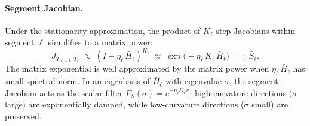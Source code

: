 \documentclass[11pt]{article}
\begin{document}
\paragraph{Segment Jacobian.} Under the stationarity approximation, the product of $K_\ell$ step Jacobians within segment $\ell$ simplifies to a matrix power:
\begin{equation}\label{eq:segment-jacobian}
  J_{T_{\ell-1}:T_\ell} \;\approx\; (I - \bar\eta_\ell\,\bar{H}_\ell)^{K_\ell} \;\approx\; \exp\bigl(-\bar\eta_\ell\,K_\ell\,\bar{H}_\ell\bigr) \;=:\; \bar{S}_\ell.
\end{equation}
The matrix exponential is well approximated by the matrix power when $\bar\eta_\ell\,\bar{H}_\ell$ has small spectral norm. In an eigenbasis of $\bar{H}_\ell$ with eigenvalue $\sigma$, the segment Jacobian acts as the scalar filter $F_S(\sigma) = e^{-\bar\eta_\ell K_\ell \sigma}$: high-curvature directions ($\sigma$ large) are exponentially damped, while low-curvature directions ($\sigma$ small) are preserved.
\end{document}
